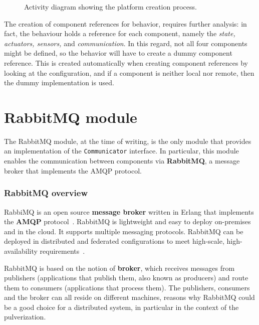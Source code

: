 \begin{figure}
	\centering
	\caption{Activity diagram showing the platform creation process.}
	\label{fig:platform-configuration}
\end{figure}

The creation of component references for behavior, requires further analysis: in fact, the behaviour holds a reference for each component, namely
the \emph{state, actuators, sensors,} and \emph{communication}. In this regard, not all four components might be defined, so the behavior will have
to create a dummy component reference. This is created automatically when creating component references by looking at the configuration, and if a
component is neither local nor remote, then the dummy implementation is used.


\section{RabbitMQ module}
\label{sec:rabbitmq-module-impl}

The RabbitMQ module, at the time of writing, is the only module that provides an implementation of the \texttt{Communicator} interface.
In particular, this module enables the communication between components via \textbf{RabbitMQ}, a message broker that implements the AMQP protocol.

\subsubsection{RabbitMQ overview}

RabbiMQ is an open source \textbf{message broker} written in Erlang that implements the \textbf{AMQP} protocol~\cite{4012603}.
RabbitMQ is lightweight and easy to deploy on-premises and in the cloud. It supports multiple messaging protocols. RabbitMQ can be deployed in
distributed and federated configurations to meet high-scale, high-availability requirements~\cite{rabbitmq}.

RabbitMQ is based on the notion of \textbf{broker}, which receives messages from publishers (applications that publish them, also known as producers)
and route them to consumers (applications that process them). The publishers, consumers and the broker can all reside on different machines,
reasons why RabbitMQ could be a good choice for a distributed system, in particular in the context of the pulverization.

